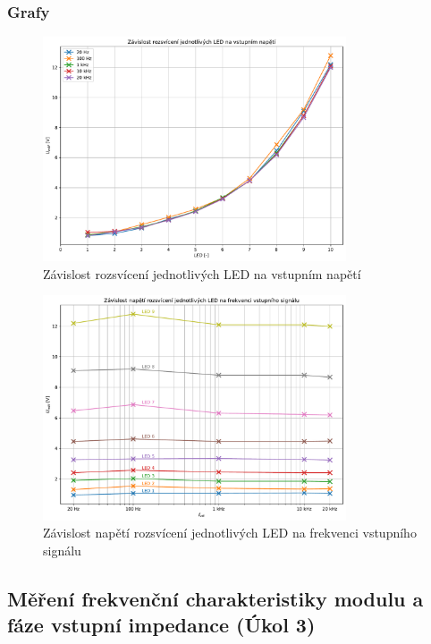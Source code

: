 \documentclass[a4paper, czech]{article}
\begin{document}
\pagebreak

\subsubsection{Grafy}

\begin{figure}[H]
    \centering
    \includegraphics[width=0.8\textwidth]{grafy/graf1.pdf}
    \caption{Závislost rozsvícení jednotlivých LED na vstupním napětí}
\end{figure}

\begin{figure}[H]
    \centering
    \includegraphics[width=0.8\textwidth]{grafy/graf2.pdf}
    \caption{Závislost napětí rozsvícení jednotlivých LED na frekvenci vstupního signálu}
\end{figure}

\subsection{Měření frekvenční charakteristiky modulu a fáze vstupní impedance (Úkol 3)}
\end{document}
